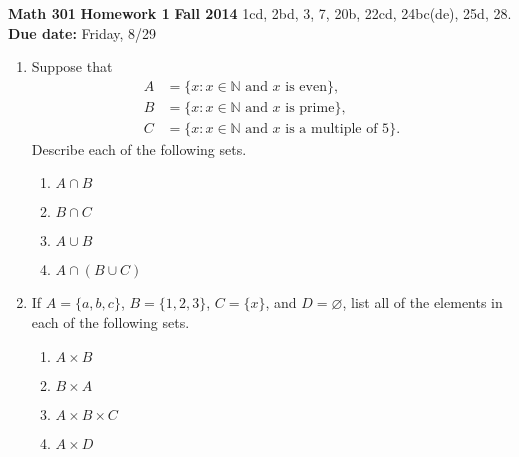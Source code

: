\documentclass[12pt,reqno]{amsart}
\renewcommand{\emptyset}{\ensuremath{\varnothing}}
\begin{document}
\thispagestyle{empty}

\noindent \textbf{Math 301} \hskip4cm {\bf Homework 1} \hfill {\bf Fall 2014}
\vskip1cm
  1cd, 2bd, 3, 7, 20b, 22cd, 24bc(de), 25d, 28.  \\
{\bf Due date:} Friday, 8/29

\medskip

\begin{enumerate}[{\bf 1.}]

\item[{\bf 1.}]
Suppose that
\begin{align*}
A & = \{ x : x \in \mathbb N \text{ and } x \text{ is even} \}, \\
B & = \{x : x \in \mathbb N \text{ and } x \text{ is prime}\}, \\
C & = \{ x : x \in \mathbb N \text{ and } x \text{ is a multiple of 5}\}.
\end{align*}
Describe each of the following sets. 
\begin{multicols}{2}
\begin{enumerate}

\item
$A \cap B$

\item
$B \cap C$

\item
$A \cup B$

\item
$A \cap (B \cup C)$

\end{enumerate}
\end{multicols}

\medskip  

\item[{\bf 2.}]
If $A = \{ a, b, c \}$, $B = \{ 1, 2, 3 \}$, $C = \{ x \}$, and 
$D = \emptyset$, list all of the elements in each of the following sets. 
\begin{multicols}{2}
\begin{enumerate}

\item
$A \times B$

\item
$B \times A$

\item
$A \times B \times C$

\item
$A \times D$


\end{enumerate}
\end{multicols}
\end{enumerate}
\end{document}
